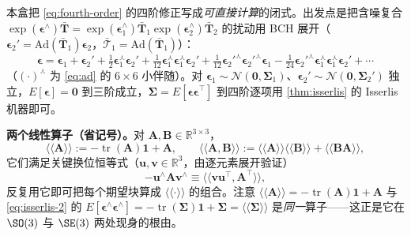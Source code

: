 \begin{derivation}\label{deriv:fourth-op}
本盒把 \cref{eq:fourth-order} 的四阶修正写成\emph{可直接计算}的闭式。出发点是把含噪复合 $\exp(\boldsymbol{\epsilon}^\wedge)\bar{\mathbf{T}}=\exp(\boldsymbol{\epsilon}_1^\wedge)\bar{\mathbf{T}}_1\exp(\boldsymbol{\epsilon}_2^\wedge)\bar{\mathbf{T}}_2$ 的扰动用 BCH 展开（$\boldsymbol{\epsilon}_2'=\mathrm{Ad}(\bar{\mathbf{T}}_1)\boldsymbol{\epsilon}_2$，$\bar{\boldsymbol{\mathcal{T}}}_1=\mathrm{Ad}(\bar{\mathbf{T}}_1)$）\cite{barfoot2024state}：
\[
  \boldsymbol{\epsilon}=\boldsymbol{\epsilon}_1+\boldsymbol{\epsilon}_2'+\tfrac12\boldsymbol{\epsilon}_1^\curlywedge\boldsymbol{\epsilon}_2'
  +\tfrac1{12}\boldsymbol{\epsilon}_1^\curlywedge\boldsymbol{\epsilon}_1^\curlywedge\boldsymbol{\epsilon}_2'
  +\tfrac1{12}\boldsymbol{\epsilon}_2'^\curlywedge\boldsymbol{\epsilon}_2'^\curlywedge\boldsymbol{\epsilon}_1
  -\tfrac1{24}\boldsymbol{\epsilon}_2'^\curlywedge\boldsymbol{\epsilon}_1^\curlywedge\boldsymbol{\epsilon}_1^\curlywedge\boldsymbol{\epsilon}_2'+\cdots
\]
（$(\cdot)^\curlywedge$ 为 \cref{eq:ad} 的 $6\times6$ 小伴随）。对 $\boldsymbol{\epsilon}_1\sim\mathcal{N}(\mathbf{0},\boldsymbol{\Sigma}_1)$、$\boldsymbol{\epsilon}_2'\sim\mathcal{N}(\mathbf{0},\boldsymbol{\Sigma}_2')$ 独立，$E[\boldsymbol{\epsilon}]=\mathbf{0}$ 到三阶成立，$\boldsymbol{\Sigma}=E[\boldsymbol{\epsilon}\boldsymbol{\epsilon}^\top]$ 到四阶逐项用 \cref{thm:isserlis} 的 Isserlis 机器即可。

\textbf{两个线性算子（省记号）。}对 $\mathbf{A},\mathbf{B}\in\mathbb{R}^{3\times3}$，
\begin{equation}
  \langle\!\langle\mathbf{A}\rangle\!\rangle:=-\operatorname{tr}(\mathbf{A})\mathbf{1}+\mathbf{A},\qquad
  \langle\!\langle\mathbf{A},\mathbf{B}\rangle\!\rangle:=\langle\!\langle\mathbf{A}\rangle\!\rangle\langle\!\langle\mathbf{B}\rangle\!\rangle+\langle\!\langle\mathbf{B}\mathbf{A}\rangle\!\rangle,
  \label{eq:angle-op}
\end{equation}
它们满足关键换位恒等式（$\mathbf{u},\mathbf{v}\in\mathbb{R}^3$，由逐元素展开验证）
\begin{equation}
  -\mathbf{u}^\wedge\mathbf{A}\mathbf{v}^\wedge\equiv\langle\!\langle\mathbf{v}\mathbf{u}^\top,\mathbf{A}^\top\rangle\!\rangle,
  \label{eq:angle-identity}
\end{equation}
反复用它即可把每个期望块算成 $\langle\!\langle\cdot\rangle\!\rangle$ 的组合。注意 $\langle\!\langle\mathbf{A}\rangle\!\rangle=-\operatorname{tr}(\mathbf{A})\mathbf{1}+\mathbf{A}$ 与 \cref{eq:isserlis-2} 的 $E[\boldsymbol{\epsilon}^\wedge\boldsymbol{\epsilon}^\wedge]=-\operatorname{tr}(\boldsymbol{\Sigma})\mathbf{1}+\boldsymbol{\Sigma}=\langle\!\langle\boldsymbol{\Sigma}\rangle\!\rangle$ 是\emph{同一}算子——这正是它在 $\SO(3)$ 与 $\SE(3)$ 两处现身的根由。


\end{derivation}
